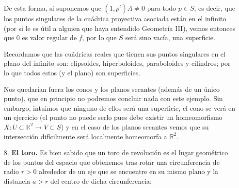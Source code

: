\begin{ejemplo}
\begin{enumerate}
        De esta forma, si suponemos que $(1,p^t)A\neq 0$ para todo $p\in S$, es decir, que los puntos singulares de la cuádrica proyectiva asociada están en el infinito (por si le es útil a alguien que haya entendido Geometría III), vemos entonces que $0$ es valor regular de $f$, por lo que $S$ será sino vacía, una superficie.

        Recordamos que las cuádricas reales que tienen sus puntos singulares en el plano del infinito son: elipsoides, hiperboloides, paraboloides y cilindros; por lo que todos estos (y el plano) son superficies.

        Nos quedarían fuera los conos y los planos secantes (además de un único punto), que en principio no podremos concluir nada con este ejemplo. Sin embargo, intuimos que ninguno de ellos será una superficie, el cono se verá en un ejercicio (el punto no puede serlo pues debe existir un homeomorfismo $X:U\subset\mathbb{R}^2\to V\subset S$) y en el caso de los planos secantes vemos que su intersección difícilmente será localmente homeomorfa a $\mathbb{R}^2$.

        \item[8.] \textbf{El toro.} Es bien sabido que un toro de revolución es el lugar geométrico de los puntos del espacio que obtenemos tras rotar una circunferencia de radio $r>0$ alrededor de un eje que se encuentre en su mismo plano y la distancia $a>r$ del centro de dicha circunferencia:
            \begin{figure}[H]
                \centering
\end{figure}
\end{enumerate}
\end{ejemplo}
